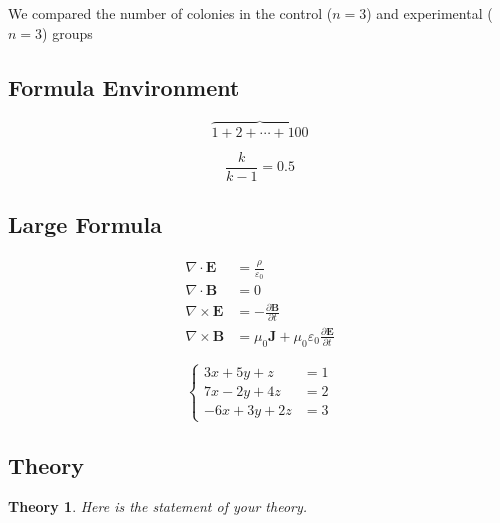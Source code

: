 \documentclass[a4paper,12pt]{article}
\begin{document}
We compared the number of colonies in the control ($n=3$) and experimental ($n=3$) groups

\subsection{Formula Environment}

\lipsum[1]

$$
    \overbrace{1+2+\cdots+100}
$$

\lipsum[1]

\begin{equation}
    \frac{k}{k-1} = 0.5
\end{equation}

    
\subsection{Large Formula}

\lipsum[1]

$$
    \begin{aligned}
        \nabla \cdot \mathbf{E} &= \frac {\rho} {\varepsilon_0} \\
        \nabla \cdot \mathbf{B} &= 0 \\
        \nabla \times \mathbf{E} &= -\frac{\partial \mathbf{B}} {\partial t} \\
        \nabla \times \mathbf{B} &= \mu_0\mathbf{J} + \mu_0\varepsilon_0\frac{\partial \mathbf{E}} {\partial t}
    \end{aligned}
$$

\lipsum[1]

\begin{equation}
    \begin{cases}
        3x + 5y + z &= 1 \\
        7x - 2y + 4z &= 2 \\
        -6x + 3y + 2z &= 3
    \end{cases}
\end{equation}


\subsection{Theory}

\lipsum[1]

\newtheorem{theory}{Theory}

\begin{theory}
    Here is the statement of your theory.
\end{theory}
\end{document}
